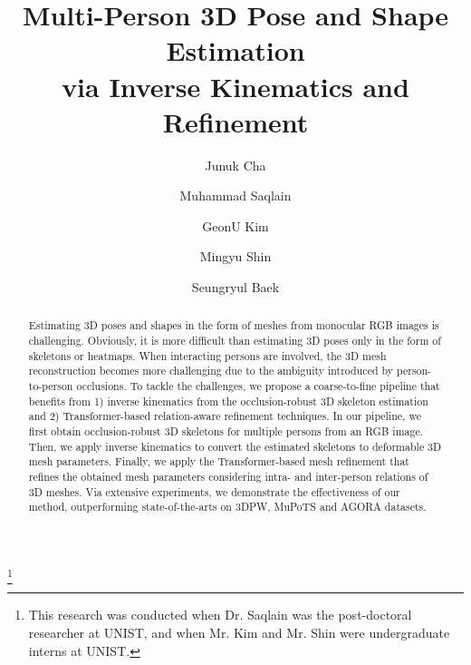 \documentclass[runningheads]{llncs}
\newcommand\blfootnote[1]{\begingroup
  \renewcommand\thefootnote{}\footnote{#1}\addtocounter{footnote}{-1}\endgroup
}
\begin{document}
\pagestyle{headings}
\mainmatter
\def\ECCVSubNumber{2418}  

\title{Multi-Person 3D Pose and Shape Estimation \\via Inverse Kinematics and Refinement} 

\begin{comment}
\titlerunning{ECCV-22 submission ID \ECCVSubNumber} 
\authorrunning{ECCV-22 submission ID \ECCVSubNumber} 
\author{Anonymous ECCV submission}
\institute{Paper ID \ECCVSubNumber}
\end{comment}


\author{Junuk Cha \and
Muhammad Saqlain \and
GeonU Kim\inst{1\ddag} \and
Mingyu Shin \and
Seungryul Baek}
\maketitle

\blfootnote{This research was conducted when Dr. Saqlain was the post-doctoral researcher at UNIST, and when Mr. Kim and Mr. Shin were undergraduate interns at UNIST.}

\begin{abstract}
Estimating 3D poses and shapes in the form of meshes from monocular RGB images is challenging. Obviously, it is more difficult than estimating 3D poses only in the form of skeletons or heatmaps. When interacting persons are involved, the 3D mesh reconstruction becomes more challenging due to the ambiguity introduced by person-to-person occlusions. To tackle the challenges, we propose a coarse-to-fine pipeline that benefits from 1) inverse kinematics from the occlusion-robust 3D skeleton estimation and 2) Transformer-based relation-aware refinement techniques. In our pipeline, we first obtain occlusion-robust 3D skeletons for multiple persons from an RGB image. Then, we apply inverse kinematics to convert the estimated skeletons to deformable 3D mesh parameters. Finally, we apply the Transformer-based mesh refinement that refines the obtained mesh parameters considering intra- and inter-person relations of 3D meshes. Via extensive experiments, we demonstrate the effectiveness of our method, outperforming state-of-the-arts on 3DPW, MuPoTS and AGORA datasets.

\end{abstract}
\end{document}
